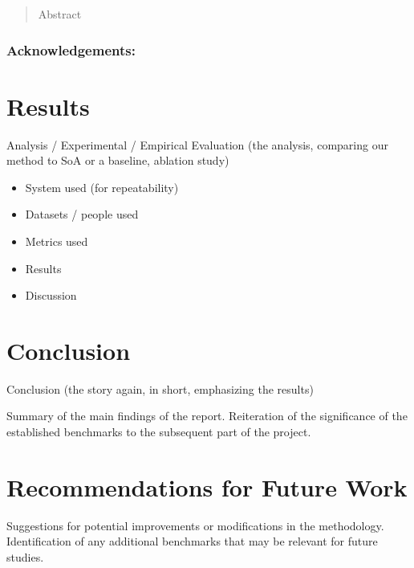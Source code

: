 
\newpage

\begin{abstract}
    Abstract
\end{abstract}

\maketitle

\subsubsection*{Acknowledgements:}








% 

\section{Results}
Analysis / Experimental / Empirical Evaluation (the analysis, comparing our method to SoA or a baseline, ablation study)
\begin{itemize}
    \item System used (for repeatability)
    \item Datasets / people used
    \item Metrics used
    \item Results
    \item Discussion
\end{itemize}

\section{Conclusion}
Conclusion (the story again, in short, emphasizing the results)

Summary of the main findings of the report.
Reiteration of the significance of the established benchmarks to the subsequent part of the project.

\section{Recommendations for Future Work}
Suggestions for potential improvements or modifications in the methodology.
Identification of any additional benchmarks that may be relevant for future studies.
